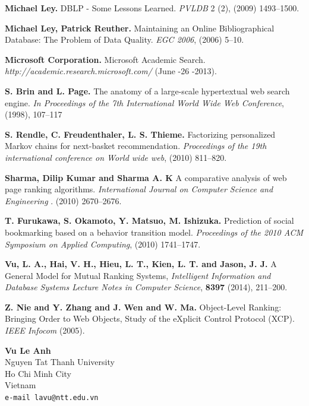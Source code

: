 \documentclass[10pt,leqno,twoside]{article}
\begin{document}
\begin{thebibliography}{99}
\textbf{Michael Ley.}
DBLP - Some Lessons Learned.
\textit{PVLDB} 2 (2), (2009) 1493--1500.



\textbf{Michael Ley, Patrick Reuther.}
Maintaining an Online Bibliographical Database: The Problem of Data Quality.
\textit{EGC 2006}, (2006) 5--10.




\textbf{Microsoft  Corporation.}
Microsoft Academic Search.
\textit{http://academic.research.microsoft.com/} (June -26 -2013).



\textbf{S. Brin and L. Page.}
The anatomy of a large-scale hypertextual web search engine.
\textit{In Proceedings of the 7th International World Wide Web
Conference}, (1998), 107--117



\textbf{S. Rendle, C. Freudenthaler, L. S. Thieme.}
Factorizing personalized Markov chains for next-basket recommendation.
\textit{Proceedings of the 19th international conference on World wide web}, (2010) 811--820.

\textbf{Sharma, Dilip Kumar and Sharma A. K}
A comparative analysis of web page ranking algorithms.
\textit{International Journal on Computer Science and Engineering} . (2010) 2670--2676.

\textbf{T. Furukawa, S. Okamoto, Y. Matsuo, M. Ishizuka.}
Prediction of social bookmarking based on a behavior transition model.
\textit{Proceedings of the 2010 ACM Symposium on Applied Computing}, (2010) 1741--1747.

\textbf{Vu, L. A., Hai, V. H., Hieu, L. T., Kien, L. T.  and Jason, J. J. }
A General Model for Mutual Ranking Systems,
\textit{Intelligent Information and Database Systems
Lecture Notes in Computer Science}, \textbf{8397} (2014), 211--200.


\textbf{Z. Nie and Y. Zhang and J. Wen and W. Ma.}
Object-Level Ranking: Bringing Order to Web Objects,
Study of the eXplicit Control Protocol (XCP).
\textit{IEEE Infocom }(2005).


\end{thebibliography}
\vspace{2cm}

\noindent\textbf{Vu Le Anh}\\
Nguyen Tat Thanh University\\
Ho Chi Minh City\\
Vietnam\\
{\tt e-mail lavu@ntt.edu.vn}\\
\end{document}
